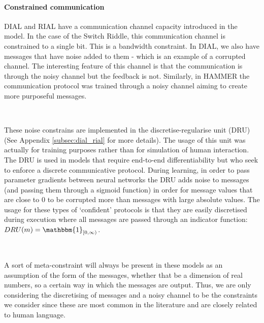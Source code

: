 \documentclass{article}
\begin{document}
\paragraph{Constrained communication} DIAL and RIAL \citep{foerster2016learning} have a communication channel capacity introduced in the model. In the case of the Switch Riddle, this communication channel is constrained to a single bit. This is a bandwidth constraint. In DIAL, we also have messages that have noise added to them - which is an example of a corrupted channel. The interesting feature of this channel is that the communication is through the noisy channel but the feedback is not. Similarly, in HAMMER \citep{gupta2022HAMMER} the communication protocol was trained through a noisy channel aiming to create more purposeful messages.

\

These noise constrains are implemented in the discretise-regularise unit (DRU) \citep{foerster2016learning} (See Appendix \ref{subsec:dial_rial} for more details). The usage of this unit was actually for training purposes rather than for simulation of human interaction. The DRU is used in models that require end-to-end differentiability but who seek to enforce a discrete communicative protocol. During learning, in order to pass parameter gradients between neural networks the DRU adds noise to messages (and passing them through a sigmoid function) in order for message values that are close to 0 to be corrupted more than messages with large absolute values. The usage for these types of `confident' protocols is that they are easily discretised during execution where all messages are passed through an indicator function: $DRU(m) = \mathbbm{1}_{[0, \infty)}$. 

\

A sort of meta-constraint will always be present in these models as an assumption of the form of the messages, whether that be a dimension of real numbers, so a certain way in which the messages are output. Thus, we are only considering the discretising of messages and a noisy channel to be the constraints we consider since these are most common in the literature and are closely related to human language.
\end{document}
